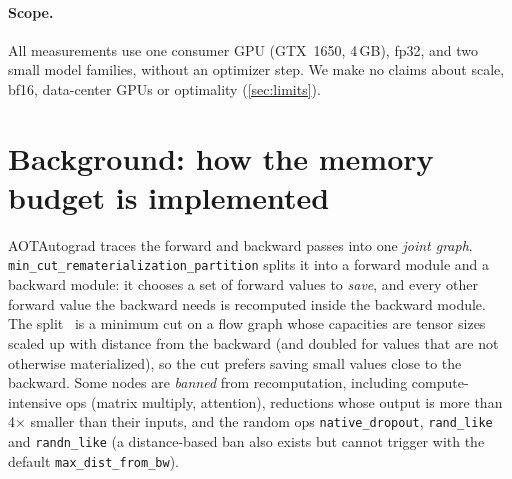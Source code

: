 \documentclass[10pt]{article}
\newcommand{\code}[1]{\texttt{#1}}
\begin{document}
\paragraph{Scope.} All measurements use one consumer GPU (GTX~1650, 4\,GB), fp32, and two small model families, without
an optimizer step. We make no claims about scale, bf16, data-center GPUs or optimality (\cref{sec:limits}).

\section{Background: how the memory budget is implemented}
\label{sec:background}

AOTAutograd traces the forward and backward passes into one \emph{joint graph}.
\code{min\_cut\_\allowbreak rematerialization\_\allowbreak partition} splits it into a forward module and a backward module: it chooses a set of
forward values to \emph{save}, and every other forward value the backward needs is recomputed inside the backward module.
The split~\citep{he2022mincut,he2023fusionaware,torchpartitioners} is a minimum cut on a flow graph whose capacities are tensor sizes scaled up with distance from the backward
(and doubled for values that are not otherwise materialized), so the cut prefers saving small values close to the
backward. Some nodes are \emph{banned} from recomputation, including compute-intensive ops (matrix multiply, attention),
reductions whose output is more than 4$\times$ smaller than their inputs, and the random ops \code{native\_dropout},
\code{rand\_like} and \code{randn\_like} (a distance-based ban also exists but cannot trigger with the default
\code{max\_dist\_from\_bw}).
\end{document}
